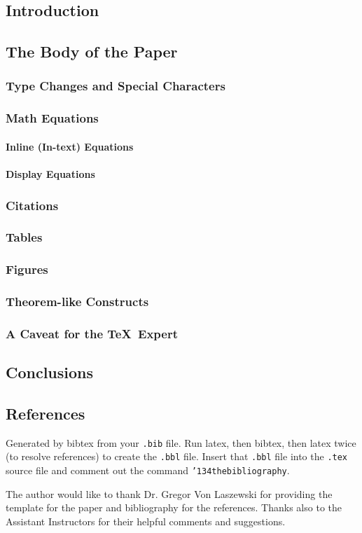 \documentclass[sigconf]{acmart}
\begin{document}
\subsection{Introduction}
\subsection{The Body of the Paper}
\subsubsection{Type Changes and  Special Characters}
\subsubsection{Math Equations}
\paragraph{Inline (In-text) Equations}
\paragraph{Display Equations}
\subsubsection{Citations}
\subsubsection{Tables}
\subsubsection{Figures}
\subsubsection{Theorem-like Constructs}
\subsubsection*{A Caveat for the \TeX\ Expert}
\subsection{Conclusions}
\subsection{References}

Generated by bibtex from your \texttt{.bib} file.  Run latex, then
bibtex, then latex twice (to resolve references) to create the
\texttt{.bbl} file.  Insert that \texttt{.bbl} file into the
\texttt{.tex} source file and comment out the command
\texttt{{\char'134}thebibliography}.


\begin{acks}

  The author would like to thank Dr. Gregor Von Laszewski for providing the \LaTex template for the paper and \JabRef bibliography for the references. Thanks also to the Assistant Instructors for their helpful comments and suggestions.

\end{acks}


 
\end{document}
